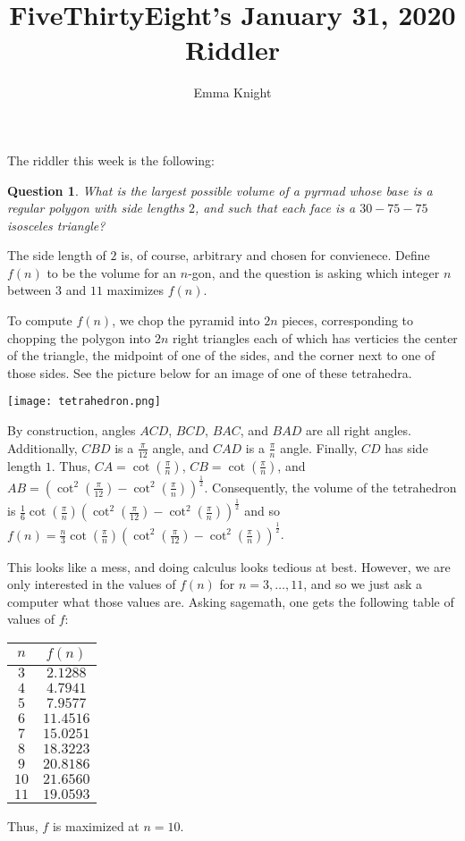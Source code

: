 \documentclass[11pt]{article}
\title{FiveThirtyEight's January 31, 2020 Riddler}
\author{Emma Knight}
\newtheorem{question}[theorem]{Question}
\theoremstyle{definition}
\begin{document}
\maketitle

The riddler this week is the following:

\begin{question}
What is the largest possible volume of a pyrmad whose base is a regular polygon with side lengths $2$, and such that each face is a $30-75-75$ isosceles triangle?
\end{question}
The side length of $2$ is, of course, arbitrary and chosen for convienece.  Define $f(n)$ to be the volume for an $n$-gon, and the question is asking which integer $n$ between $3$ and $11$ maximizes $f(n)$.

To compute $f(n)$, we chop the pyramid into $2n$ pieces, corresponding to chopping the polygon into $2n$ right triangles each of which has verticies the center of the triangle, the midpoint of one of the sides, and the corner next to one of those sides.  See the picture below for an image of one of these tetrahedra.

\texttt{[image: tetrahedron.png]}

By construction, angles $ACD$, $BCD$, $BAC$, and $BAD$ are all right angles.  Additionally, $CBD$ is a $\frac{\pi}{12}$ angle, and $CAD$ is a $\frac{\pi}{n}$ angle.  Finally, $CD$ has side length $1$.  Thus, $CA = \cot\left(\frac{\pi}{n}\right)$, $CB = \cot\left(\frac{\pi}{n}\right)$, and $AB = \left(\cot^2\left(\frac{\pi}{12}\right) - \cot^2\left(\frac{\pi}{n}\right)\right)^{\frac{1}{2}}$.  Consequently, the volume of the tetrahedron is $\frac{1}{6}\cot\left(\frac{\pi}{n}\right) \left(\cot^2\left(\frac{\pi}{12}\right) - \cot^2\left(\frac{\pi}{n}\right)\right)^{\frac{1}{2}}$ and so $f(n) = \frac{n}{3}\cot\left(\frac{\pi}{n}\right) \left(\cot^2\left(\frac{\pi}{12}\right) - \cot^2\left(\frac{\pi}{n}\right)\right)^{\frac{1}{2}}$.

This looks like a mess, and doing calculus looks tedious at best.  However, we are only interested in the values of $f(n)$ for $n=3, \ldots, 11$, and so we just ask a computer what those values are.  Asking sagemath, one gets the following table of values of $f$:
\begin{center}
\begin{tabular}{|c|c|}
\hline
$n$ & $f(n)$ \\
\hline
\hline
$3$ & $2.1288$ \\
\hline
$4$ & $4.7941$\\
\hline
$5$ & $7.9577$\\
\hline
$6$ & $11.4516$\\
\hline
$7$ & $15.0251$\\
\hline
$8$ & $18.3223$\\
\hline
$9$ & $20.8186$\\
\hline
$10$ & $21.6560$\\
\hline
$11$ & $19.0593$\\
\hline
\end{tabular}
\end{center}
Thus, $f$ is maximized at $n = 10$.
\end{document}
